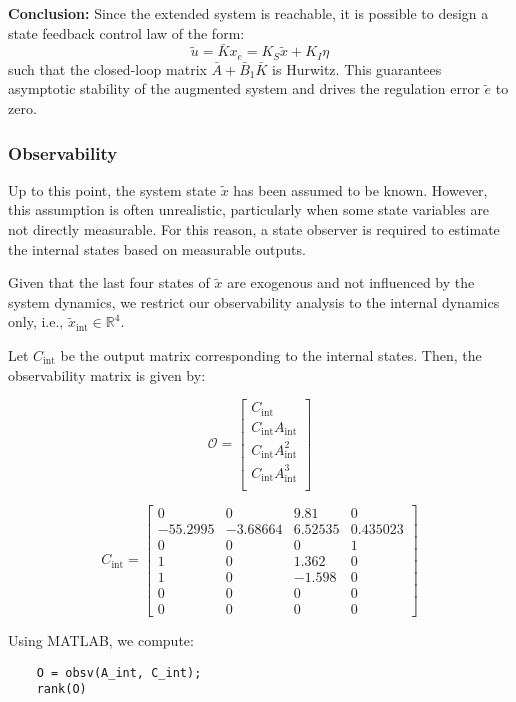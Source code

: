 \documentclass[]{report}
\begin{document}
\textbf{Conclusion:}  
Since the extended system is reachable, it is possible to design a state feedback control law of the form:
\[
\tilde{u} = \bar{K} x_e = K_S \tilde{x} + K_I \eta
\]
such that the closed-loop matrix $\bar{A} + \bar{B}_1 \bar{K}$ is Hurwitz. This guarantees asymptotic stability of the augmented system and drives the regulation error $\tilde{e}$ to zero.



\subsubsection{Observability}

Up to this point, the system state $\tilde{x}$ has been assumed to be known. However, this assumption is often unrealistic, particularly when some state variables are not directly measurable. For this reason, a state observer is required to estimate the internal states based on measurable outputs.

Given that the last four states of $\tilde{x}$ are exogenous and not influenced by the system dynamics, we restrict our observability analysis to the internal dynamics only, i.e., $\tilde{x}_{\text{int}} \in \mathbb{R}^4$.

Let $C_{\text{int}}$ be the output matrix corresponding to the internal states. Then, the observability matrix is given by:

\[
\mathcal{O} = \begin{bmatrix}
	C_{\text{int}} \\
	C_{\text{int}} A_{\text{int}} \\
	C_{\text{int}} A_{\text{int}}^2 \\
	C_{\text{int}} A_{\text{int}}^3 \\
\end{bmatrix}
\]

\[
C_{\text{int}} =
\begin{bmatrix}
	0 & 0 & 9.81 & 0 \\
	-55.2995 & -3.68664 & 6.52535 & 0.435023 \\
	0 & 0 & 0 & 1 \\
	1 & 0 & 1.362 & 0  \\
	1 & 0 & -1.598 & 0 \\
	0 & 0 & 0 & 0 \\
	0 & 0 & 0 & 0 
\end{bmatrix}
\]

Using MATLAB, we compute:

\begin{verbatim}
	O = obsv(A_int, C_int);
	rank(O)
\end{verbatim}
\end{document}

